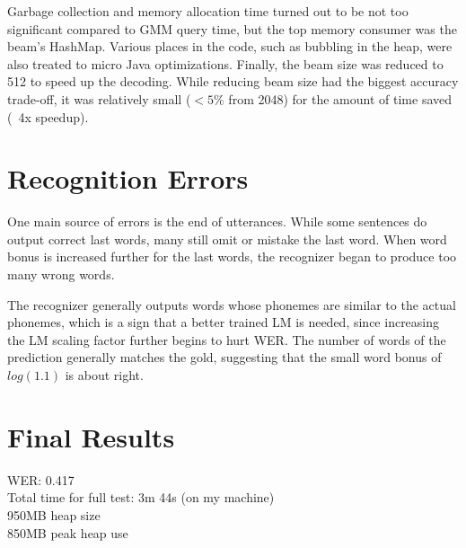\documentclass[11pt]{article}
\begin{document}
Garbage collection and memory allocation time turned out to be not too significant compared to GMM query time, but the top memory consumer was the beam's HashMap. Various places in the code, such as bubbling in the heap, were also treated to micro Java optimizations. Finally, the beam size was reduced to 512 to speed up the decoding. While reducing beam size had the biggest accuracy trade-off, it was relatively small ($<5\%$ from 2048) for the amount of time saved (~4x speedup).

\section{Recognition Errors}

One main source of errors is the end of utterances. While some sentences do output correct last words, many still omit or mistake the last word. When word bonus is increased further for the last words, the recognizer began to produce too many wrong words. 

The recognizer generally outputs words whose phonemes are similar to the actual phonemes, which is a sign that a better trained LM is needed, since increasing the LM scaling factor further begins to hurt WER. The number of words of the prediction generally matches the gold, suggesting that the small word bonus of $log(1.1)$ is about right.

\section{Final Results}

WER: 0.417\\
Total time for full test: 3m 44s (on my machine)\\
950MB heap size\\
850MB peak heap use
\end{document}
